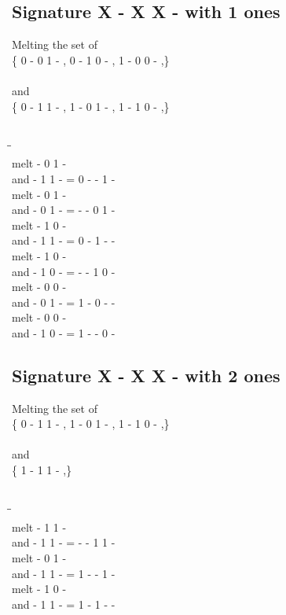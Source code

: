\documentclass{article}
\begin{document}
\subsection{Signature X - X X - with 1 ones}
Melting the set of\\
\{ 0  -  0  1  - , 0  -  1  0  - , 1  -  0  0  - ,\}\\\\
and\\
\{ 0  -  1  1  - , 1  -  0  1  - , 1  -  1  0  - ,\}\\\\
\begin{tabbing}
\hspace{3cm}\=\hspace{3cm}\=\hspace{3cm}\\[1cm]
melt  -  0  1  - \\
and  -  1  1  - \>
 =  0  -  -  1  - \\[1mm]
melt  -  0  1  - \\
and  -  0  1  - \>
 =  -  -  0  1  - \\[1mm]
melt  -  1  0  - \\
and  -  1  1  - \>
 =  0  -  1  -  - \\[1mm]
melt  -  1  0  - \\
and  -  1  0  - \>
 =  -  -  1  0  - \\[1mm]
melt  -  0  0  - \\
and  -  0  1  - \>
 =  1  -  0  -  - \\[1mm]
melt  -  0  0  - \\
and  -  1  0  - \>
 =  1  -  -  0  - \\[1mm]
\end{tabbing}
\newpage
\subsection{Signature X - X X - with 2 ones}
Melting the set of\\
\{ 0  -  1  1  - , 1  -  0  1  - , 1  -  1  0  - ,\}\\\\
and\\
\{ 1  -  1  1  - ,\}\\\\
\begin{tabbing}
\hspace{3cm}\=\hspace{3cm}\=\hspace{3cm}\\[1cm]
melt  -  1  1  - \\
and  -  1  1  - \>
 =  -  -  1  1  - \\[1mm]
melt  -  0  1  - \\
and  -  1  1  - \>
 =  1  -  -  1  - \\[1mm]
melt  -  1  0  - \\
and  -  1  1  - \>
 =  1  -  1  -  - \\[1mm]
\end{tabbing}
\newpage
\end{document}
